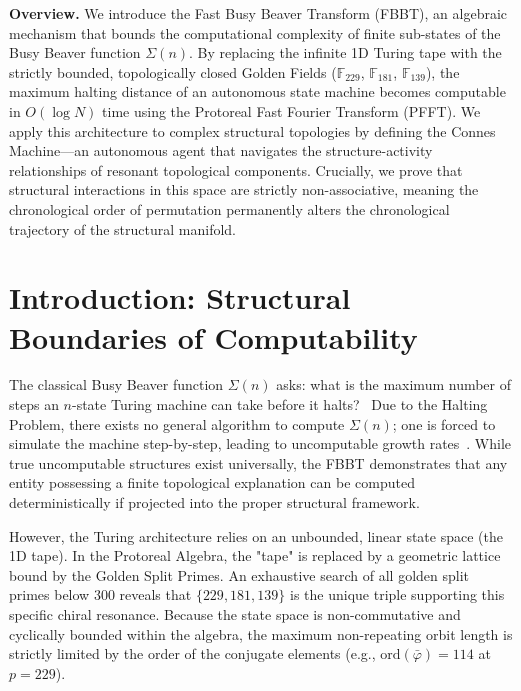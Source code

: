 \documentclass[12pt,oneside]{article}
\theoremstyle{principia}
\theoremstyle{definition}
\theoremstyle{remark}
\begin{document}
\vspace{1em}\noindent\textbf{Overview.}
We introduce the Fast Busy Beaver Transform (FBBT), an algebraic mechanism that bounds the computational complexity of finite sub-states of the Busy Beaver function $\Sigma(n)$. By replacing the infinite 1D Turing tape with the strictly bounded, topologically closed Golden Fields ($\mathbb{F}_{229}$, $\mathbb{F}_{181}$, $\mathbb{F}_{139}$), the maximum halting distance of an autonomous state machine becomes computable in $O(\log N)$ time using the Protoreal Fast Fourier Transform (PFFT). We apply this architecture to complex structural topologies by defining the Connes Machine---an autonomous agent that navigates the structure-activity relationships of resonant topological components. Crucially, we prove that structural interactions in this space are strictly non-associative, meaning the chronological order of permutation permanently alters the chronological trajectory of the structural manifold.
\vspace{1em}


\section{Introduction: Structural Boundaries of Computability}

The classical Busy Beaver function $\Sigma(n)$ asks: what is the maximum number of steps an $n$-state Turing machine can take before it halts?~\cite{rado1962, linrado1965} Due to the Halting Problem, there exists no general algorithm to compute $\Sigma(n)$; one is forced to simulate the machine step-by-step, leading to uncomputable growth rates~\cite{aaronson2020}. While true uncomputable structures exist universally, the FBBT demonstrates that any entity possessing a finite topological explanation can be computed deterministically if projected into the proper structural framework.

However, the Turing architecture relies on an unbounded, linear state space (the 1D tape). In the Protoreal Algebra, the "tape" is replaced by a geometric lattice bound by the Golden Split Primes. An exhaustive search of all golden split primes below 300 reveals that $\{229, 181, 139\}$ is the unique triple supporting this specific chiral resonance. Because the state space is non-commutative and cyclically bounded within the algebra, the maximum non-repeating orbit length is strictly limited by the order of the conjugate elements (e.g., $\text{ord}(\bar{\varphi}) = 114$ at $p=229$).
\end{document}
